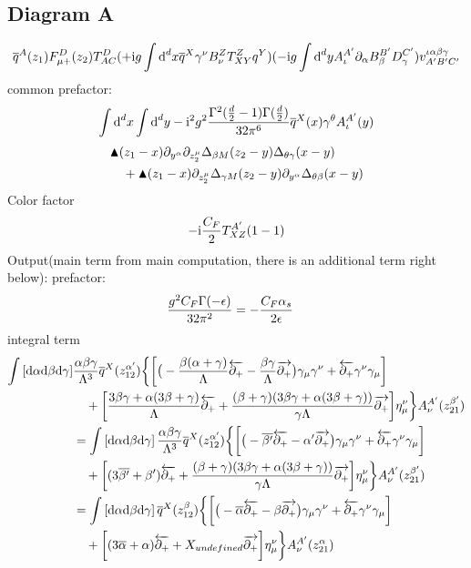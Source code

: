\subsection{Diagram A}
\begin{align}
\overline q^A(z_1) F_{\mu +}^D(z_2) T^D_{AC}   (+\text{i} g \int \text{d} ^d x \overline q^X \gamma^\nu B_\nu^Z T^Z_{XY} q^Y)(-\text{i} g \int \text{d} ^d y A^{A'}_\iota \partial_\alpha B_\beta^{B'}D_\gamma^{C'})v^{\iota\alpha\beta\gamma}_{A'B'C'}
\end{align}
common prefactor:
\begin{align}
\int \text{d} ^d x \int \text{d} ^d y -\text{i}^2 g^2 \frac{\Gamma^2(\frac{d}{2}-1)\Gamma(\frac{d}{2})}{32\pi^6} \overline q^X(x)\gamma^\theta A_\iota^{A'}(y)
\end{align}
\begin{align}
&\blacktriangle(z_1-x)\partial_{y^\alpha}\partial_{z_2^\mu}\Delta_{\beta M}(z_2-y)\Delta_{\theta \gamma}(x-y)
\\&~~~
+\blacktriangle(z_1-x)\partial_{z_2^\mu}\Delta_{\gamma M}(z_2-y)\partial_{y^\alpha}\Delta_{\theta \beta}(x-y) 
\end{align}
Color factor
\begin{align}
-\text{i}\frac{C_F}{2} T^{A'}_{XZ}(1-1)
\end{align}
Output(main term from main computation, there is an additional term right below):
prefactor:
\begin{align}
\frac{g^2 C_F\Gamma(-\epsilon)}{32\pi^2}&=-\frac{C_F\alpha_s}{2\epsilon} 
\end{align}
integral term
\begin{align}
\int \left[\text{d} \alpha \text{d} \beta \text{d} \gamma\right]& \frac{\alpha \beta \gamma}{\Lambda^3}\overline q^X(z_{12}^{\alpha'})\bigg\{ \bigg[ \big(-\frac{\beta(\alpha+\gamma)}{\Lambda } \overleftarrow{\partial_+} - \frac{\beta\gamma}{\Lambda} \overrightarrow{\partial_+} \big) \gamma_\mu \gamma^\nu +  \overleftarrow{\partial_+} \gamma^\nu \gamma_\mu\bigg] 
\\&~~~
+ \bigg[  \frac{3\beta\gamma +\alpha(3\beta +\gamma)}{\Lambda} \overleftarrow{\partial_+} + \frac{(\beta+\gamma)(3\beta\gamma +\alpha(3\beta+\gamma))}{\gamma \Lambda} \overrightarrow{\partial_+} \bigg] \eta _{\mu}^\nu\bigg\} A_\nu^{A'}(z_{21}^{\beta'})
\\
&=
\int \left[\text{d} \alpha \text{d} \beta \text{d} \gamma\right] \frac{\alpha \beta \gamma}{\Lambda^3}\overline q^X(z_{12}^{\alpha'})\bigg\{ \bigg[ \big(-\overline{\beta'} \overleftarrow{\partial_+} - \alpha' \overrightarrow{\partial_+} \big) \gamma_\mu \gamma^\nu +  \overleftarrow{\partial_+} \gamma^\nu \gamma_\mu\bigg] 
\\&~~~
+ \bigg[  (3\overline{\beta'} + \beta') \overleftarrow{\partial_+} + \frac{(\beta+\gamma)(3\beta\gamma +\alpha(3\beta+\gamma))}{\gamma \Lambda} \overrightarrow{\partial_+} \bigg] \eta _{\mu}^\nu\bigg\} A_\nu^{A'}(z_{21}^{\beta'})
\\
&=
\int \left[\text{d} \alpha \text{d} \beta \text{d} \gamma\right] \overline q^X(z_{12}^{\beta})\bigg\{ \bigg[ \big(-\overline{\alpha} \overleftarrow{\partial_+} - \beta \overrightarrow{\partial_+} \big) \gamma_\mu \gamma^\nu +  \overleftarrow{\partial_+} \gamma^\nu \gamma_\mu\bigg] 
\\&~~~
+ \bigg[  (3\overline{\alpha} + \alpha) \overleftarrow{\partial_+} + X_{undefined} \overrightarrow{\partial_+} \bigg] \eta _{\mu}^\nu\bigg\} A_\nu^{A'}(z_{21}^{\alpha})
\end{align}
